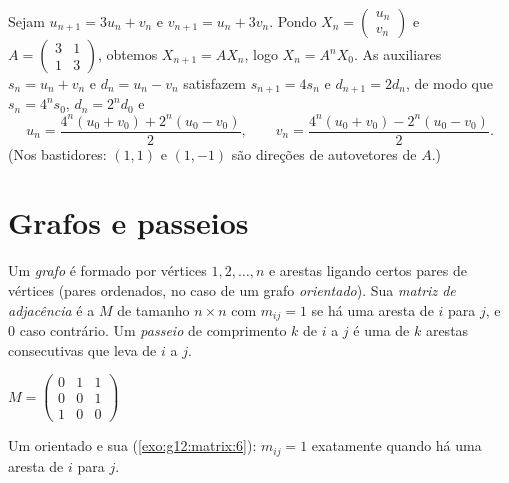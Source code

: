 \begin{example}\label{ex:g12:matrix:coupled}
Sejam $u_{n+1} = 3u_n + v_n$ e $v_{n+1} = u_n + 3v_n$. Pondo
$X_n = \begin{pmatrix} u_n\\ v_n \end{pmatrix}$ e
$A = \begin{pmatrix} 3 & 1\\ 1 & 3\end{pmatrix}$, obtemos
$X_{n+1} = AX_n$, logo $X_n = A^n X_0$. As  auxiliares
$s_n = u_n + v_n$ e $d_n = u_n - v_n$ satisfazem $s_{n+1} = 4s_n$ e
$d_{n+1} = 2d_n$, de modo que $s_n = 4^n s_0$, $d_n = 2^n d_0$ e
\[
u_n = \frac{4^n(u_0+v_0) + 2^n(u_0-v_0)}{2}, \qquad
v_n = \frac{4^n(u_0+v_0) - 2^n(u_0-v_0)}{2}.
\]
(Nos bastidores: $(1,1)$ e $(1,-1)$ são direções de autovetores de $A$.)
\end{example}

\section{Grafos e passeios}

\begin{definition}\label{def:g12:matrix:graph}
Um \emph{grafo} é formado por vértices $1, 2, \dots, n$ e
arestas ligando certos pares de vértices (pares ordenados, no caso de um
grafo \emph{orientado}). Sua \emph{matriz de adjacência} é a  $M$ de tamanho $n \times n$ com $m_{ij} = 1$ se há
uma aresta de $i$ para $j$, e $0$ caso contrário. Um \emph{passeio} de
comprimento $k$ de $i$ a $j$ é uma  de $k$ arestas consecutivas
que leva de $i$ a $j$.
\end{definition}

\begin{omfigure}
\qquad\qquad
$M = \begin{pmatrix} 0 & 1 & 1\\ 0 & 0 & 1\\ 1 & 0 & 0 \end{pmatrix}$

{\small Um  orientado e sua 
(\cref{exo:g12:matrix:6}): $m_{ij} = 1$ exatamente quando há uma aresta
de $i$ para $j$.}
\end{omfigure}

